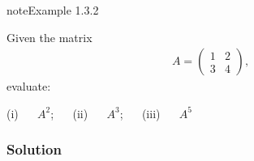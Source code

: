 \documentclass[letterpaper,10pt,english]{jupyterBook}
\begin{document}
\begin{sphinxadmonition}{note}{Example 1.3.2}



\sphinxAtStartPar
Given the matrix
\begin{equation*}
\begin{split} A = \begin{pmatrix} 1 & 2 \\ 3 & 4 \end{pmatrix}, \end{split}
\end{equation*}
\sphinxAtStartPar
evaluate:

\sphinxAtStartPar
(i)   \(A^2\);   (ii)   \(A^3\);   (iii)   \(A^5\)
\subsubsection*{Solution}


\end{sphinxadmonition}
\end{document}
